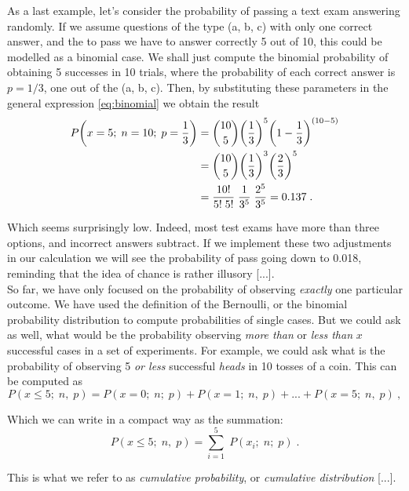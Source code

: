 \documentclass{book}
\begin{document}
As a last example, let's consider the probability of passing a text exam answering randomly. If we assume questions of the type (a, b, c) with only one correct answer, and the to pass we have to answer correctly 5 out of 10, this could be modelled as a binomial case. We shall just compute the binomial probability of obtaining 5 successes in 10 trials, where the probability of each correct answer is $p = 1/3$, one out of the (a, b, c). Then, by substituting these parameters in the general expression \eqref{eq:binomial} we obtain the result
\begin{align}
    P\bigg(x=5; \; n = 10; \; p = \frac{1}{3}\bigg) & = \binom{10}{5} \bigg(\frac{1}{3}\bigg)^5 \bigg(1 - \frac{1}{3}\bigg)^{(10 - 5)}  \notag \\
	& = \binom{10}{5} \bigg(\frac{1}{3}\bigg)^3 \bigg(\frac{2}{3}\bigg)^5 \notag \\
	& = \frac{10!}{5! \; 5!} \; \frac{1}{3^5} \; \frac{2^5}{3^5} = 0.137 \; . \nonumber
\end{align}

Which seems surprisingly low. Indeed, most test exams have more than three options, and incorrect answers subtract. If we implement these two adjustments in our calculation we will see the probability of pass going down to 0.018, reminding that the idea of chance is rather illusory [...].\\

So far, we have only focused on the probability of observing \textit{exactly} one particular outcome. We have used the definition of the Bernoulli, or the binomial probability distribution to compute probabilities of single cases. But we could ask as well, what would be the probability observing \textit{more than} or \textit{less than} $x$ successful cases in a set of experiments. For example, we could ask what is the probability of observing 5 \textit{or less} successful \textit{heads} in 10 tosses of a coin. This can be computed as
\begin{equation}
    P(x \leq 5; \; n, \; p) = P(x = 0; \; n; \; p) + P(x = 1; \; n, \; p) + ... + P(x = 5; \; n, \; p) \: ,
\end{equation}

Which we can write in a compact way as the summation:
\begin{equation}
    P(x \leq 5; \; n, \; p) = \sum_{i = 1}^{5} \; P(x_i; \; n; \; p) \; . 
\end{equation}

This is what we refer to as \textit{cumulative probability}, or \textit{cumulative distribution} [...].\\
\end{document}

